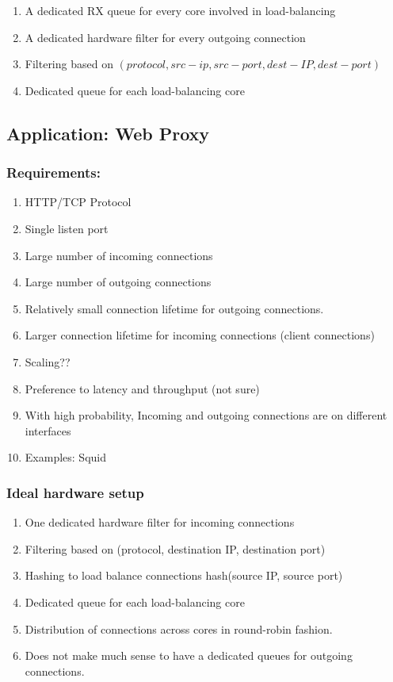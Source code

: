 \begin{enumerate}
    \item A dedicated RX queue for every core involved in load-balancing
    \item A dedicated hardware filter for every outgoing connection
    \item Filtering based on $(protocol, src-ip, src-port,  dest-IP, dest-port)$
    \item Dedicated queue for each load-balancing core
\end{enumerate}

\subsection{Application: Web Proxy}

\subsubsection{Requirements:}
\begin{enumerate}
    \item HTTP/TCP Protocol
    \item Single listen port
    \item Large number of incoming connections
    \item Large number of outgoing connections
    \item Relatively small connection lifetime for outgoing connections.
    \item Larger connection lifetime for incoming connections (client connections)
    \item Scaling??
    \item Preference to latency and throughput (not sure)
    \item With high probability, Incoming and outgoing connections are on
            different interfaces
    \item Examples: Squid
\end{enumerate}

\subsubsection{Ideal hardware setup}
\begin{enumerate}
    \item One dedicated hardware filter for incoming connections
    \item Filtering based on (protocol, destination IP, destination port)
    \item Hashing to load balance connections hash(source IP, source port)
    \item Dedicated queue for each load-balancing core
    \item Distribution of connections across cores in round-robin fashion.
    \item Does not make much sense to have a dedicated queues for outgoing
            connections.
\end{enumerate}



